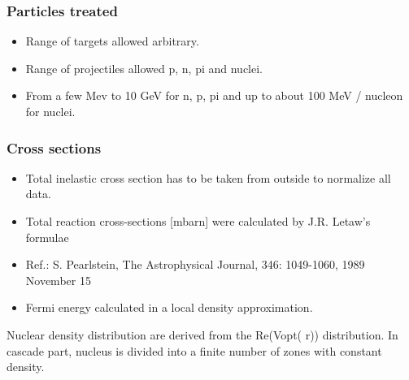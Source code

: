 \subsubsection{Particles treated}
\begin{itemize}
\item Range of targets allowed arbitrary.
\item Range of projectiles allowed p, n, pi and nuclei.
\item From a few Mev to 10 GeV for n, p, pi and up to about 100 MeV / nucleon for nuclei.
\end{itemize}

\subsubsection{Cross sections}
\begin{itemize}
\item Total inelastic cross section has to be taken from outside to normalize all data. 
\item Total reaction cross-sections [mbarn] were calculated by J.R. Letaw's formulae 

 
\item Ref.: S. Pearlstein, The Astrophysical Journal, 346: 1049-1060, 1989 November 15
\item Fermi energy calculated in a local density approximation.
\end{itemize}

Nuclear density distribution are derived from the Re(Vopt( r)) distribution. In cascade part, nucleus is divided into a finite number of zones with constant density.


